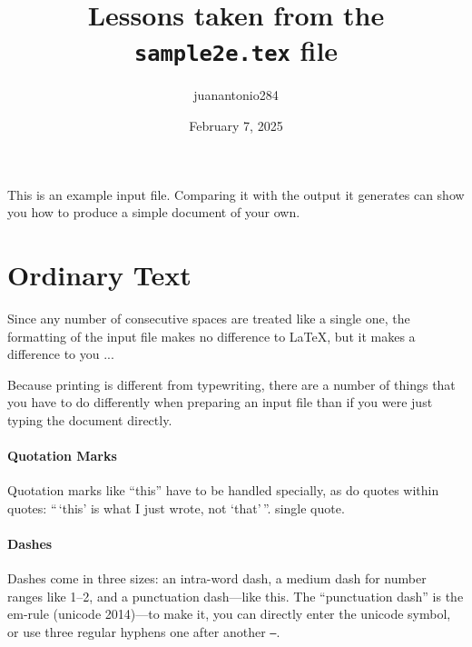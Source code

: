 \documentclass{article}      %
\title{Lessons taken from the {\tt sample2e.tex} file}  %
\author{juanantonio284}                                 %
\date{February 7, 2025}
\begin{document}

\maketitle                   %

This is an example input file. Comparing it with the output it generates can show you how to produce
a simple document of your own.

\section{Ordinary Text}      %

Since any number of consecutive spaces are treated like a single one, the formatting of the input file makes no difference to \LaTeX, but it makes a difference to you ...

Because printing is different from typewriting, there are a number of things that you have to do
differently when preparing an input file than if you were just typing the document directly.

\paragraph{Quotation Marks} Quotation marks like ``this'' have to be handled specially, as do quotes
 within quotes: ``\,`this' is what I just wrote, not `that'\,''. %
 single quote.

\paragraph{Dashes} Dashes come in three sizes: an intra-word dash, a medium dash for number ranges
 like 1--2, and a punctuation dash---like this. The ``punctuation dash'' is the em-rule
 (unicode 2014)—to make it, you can directly enter the unicode symbol, or use three regular hyphens
 one after another {\tt ---}.
\end{document}
